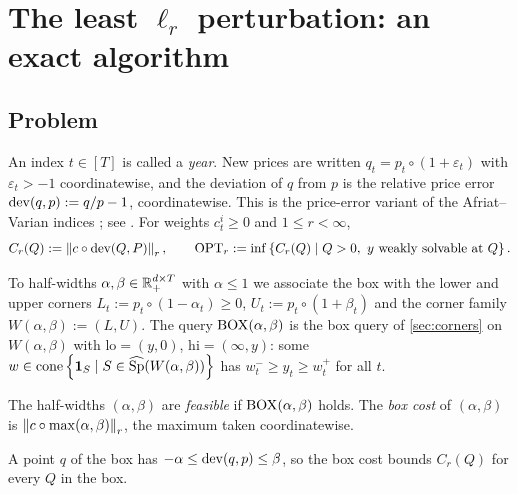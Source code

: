 \section{The least $\ell_r$ perturbation: an exact algorithm}\label{sec:lp}

\subsection{Problem}
An index $t\in[T]$ is called a \emph{year}. New prices are written $q_t=p_t\circ(1+\varepsilon_t)$ with $\varepsilon_t>-1$ coordinatewise, and the deviation of $q$ from $p$ is the relative price error $\dev(q,p):=q/p-1$, coordinatewise. This is the price-error variant of the Afriat--Varian indices \citep{Varian1985}; see \citet{DemuynckRehbeck2023}. For weights $c^i_t\ge0$ and $1\le r<\infty$,
\[
C_r(Q):=\norm{c\circ\dev(Q,P)}_r,\qquad\OPT_r:=\inf\set{C_r(Q)\mid Q>0,\ y\text{ weakly solvable at }Q}.
\]

To half-widths $\alpha,\beta\in\Rp[d\times T]$ with $\alpha\le1$ we associate the box with the lower and upper corners $L_t:=p_t\circ(1-\alpha_t)\ge0$, $U_t:=p_t\circ(1+\beta_t)$ and the corner family $W(\alpha,\beta):=(L,U)$. The query $\BOX(\alpha,\beta)$ is the box query of \cref{sec:corners} on $W(\alpha,\beta)$ with $\mathrm{lo}=(y,0)$, $\mathrm{hi}=(\infty,y)$: some $w\in\cone\set{\ind S\mid S\in\wSp(W(\alpha,\beta))}$ has $w^-_t\ge y_t\ge w^+_t$ for all $t$.

\begin{definition}\label{def:boxfeasible}
The half-widths $(\alpha,\beta)$ are \emph{feasible} if $\BOX(\alpha,\beta)$ holds. The \emph{box cost} of $(\alpha,\beta)$ is $\norm{c\circ\max(\alpha,\beta)}_r$, the maximum taken coordinatewise.
\end{definition}
A point $q$ of the box has $-\alpha\le\dev(q,p)\le\beta$, so the box cost bounds $C_r(Q)$ for every $Q$ in the box.

